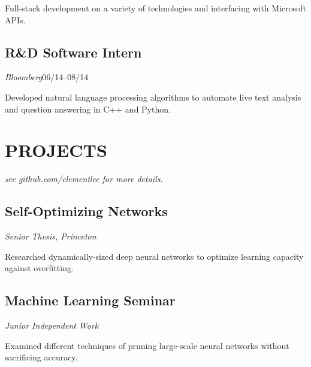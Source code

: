 \documentclass[11pt]{article}
\begin{document}
\begin{minipage}[t]{0.55\textwidth}
  Full-stack development on a variety of technologies and interfacing with Microsoft APIs.

  \medskip
  \subsection*{R\&D Software Intern}
  \emph{Bloomberg}\hfill 06/14--08/14
  \smallskip

  Developed natural language processing algorithms to automate live text analysis and question answering in C++ and Python.

  \bigskip
  \section*{\LARGE PROJECTS}
  \emph{see github.com/clementlee for more details.}
  
  \medskip
  \subsection*{Self-Optimizing Networks}
  \emph{Senior Thesis, Princeton}
  \smallskip

  Researched dynamically-sized deep neural networks to optimize learning capacity against overfitting.

  \medskip
  \subsection*{Machine Learning Seminar}
  \emph{Junior Independent Work}
  \smallskip

  Examined different techniques of pruning large-scale neural networks without sacrificing accuracy.
  

  
\end{minipage}
\end{document}
